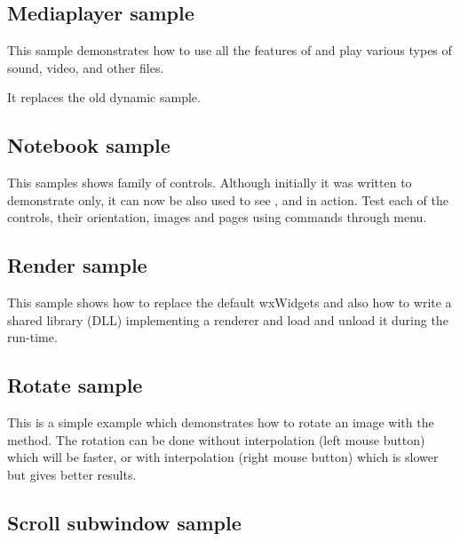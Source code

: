\subsection{Mediaplayer sample}\label{samplemediaplayer}

This sample demonstrates how to use all the features of
 and play various types of sound, video,
and other files.


It replaces the old dynamic sample.

\subsection{Notebook sample}\label{samplenotebook}

This samples shows  family of controls.
Although initially it was written to demonstrate 
only, it can now be also used to see ,
 and  in action.
Test each of the controls, their orientation, images and pages using commands through menu.



\subsection{Render sample}\label{samplerender}

This sample shows how to replace the default wxWidgets
 and also how to write a shared library
(DLL) implementing a renderer and load and unload it during the run-time.



\subsection{Rotate sample}\label{samplerotate}

This is a simple example which demonstrates how to rotate an image with
the  method. The rotation can
be done without interpolation (left mouse button) which will be faster,
or with interpolation (right mouse button) which is slower but gives
better results.


\subsection{Scroll subwindow sample}\label{samplescrollsub}

